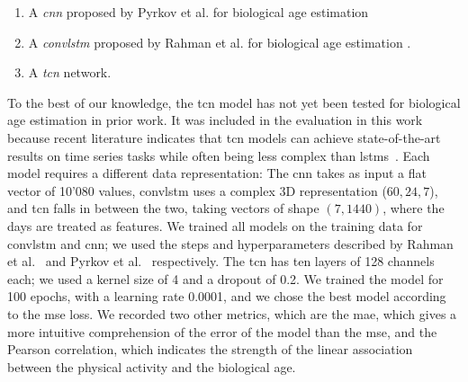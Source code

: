 \begin{enumerate}
    \item A \textit{\gls{cnn}} proposed by Pyrkov et al.  for biological age estimation \cite{pyrkov_extracting_2018}
    \item A \textit{\gls{convlstm}} proposed by Rahman et al. for biological age estimation \cite{rahman_deep_2019}.
    \item A \textit{\gls{tcn}} \cite{lea_temporal_2016, bai_empirical_2018} network. 
    \end{enumerate}
To the best of our knowledge, the \gls{tcn} model has not yet been tested for biological age estimation in prior work. It was included in the evaluation in this work because recent literature indicates that \gls{tcn} models can achieve state-of-the-art results on time series tasks while often being less complex than \gls{lstm}s~\cite{bai_empirical_2018}.
Each model requires a different data representation: The \gls{cnn} takes as input a flat vector of 10'080 values, \gls{convlstm} uses a complex 3D representation ($60, 24, 7$), and \gls{tcn} falls in between the two, taking vectors of shape $(7, 1440)$, where the days are treated as features. We trained all models on the training data for \gls{convlstm} and \gls{cnn}; we used the steps and hyperparameters described by Rahman et al.~\cite{rahman_deep_2019} and Pyrkov et al.~\cite{pyrkov_extracting_2018} respectively.
The \gls{tcn} has ten layers of 128 channels each; we used a kernel size of 4 and a dropout of 0.2. We trained the model for 100 epochs, with a learning rate 0.0001, and we chose the best model according to the \gls{mse} loss. We recorded two other metrics, which are the \gls{mae}, which gives a more intuitive comprehension of the error of the model than the \gls{mse}, and the Pearson correlation, which indicates the strength of the linear association between the physical activity and the biological age. 

